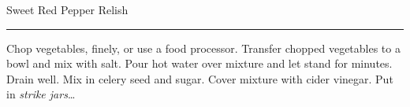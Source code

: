\begin{recipe}{Sweet Red Pepper Relish}{}{}
\rule{\textwidth}{0.05pt}
Chop vegetables, finely, or use a food processor.
Transfer chopped vegetables to a bowl and mix with salt.
Pour hot water over mixture and let stand for \unit[15]{minutes}.
\newstep Drain well.
Mix in  celery seed and sugar.
Cover mixture with cider vinegar.
\newstep Put in \emph{strike jars}\ldots
\end{recipe}
